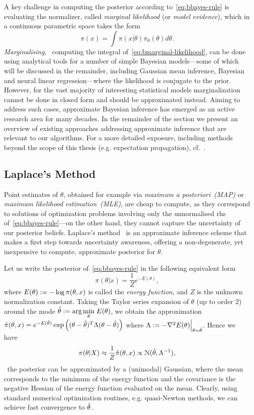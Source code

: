 A key challenge in computing the posterior according to~\cref{eq:bbayes-rule} is evaluating the normalizer, called \emph{marginal likelihood} (or \emph{model evidence}), which in a continuous parametric space takes the form
\[
\pi(x) = \int \pi(x|\theta) \pi_0(\theta) d\theta.
\label{eq:bmarginal-likelihood}
\]
\emph{Marginalising}, \ie~computing the integral of~\cref{eq:bmarginal-likelihood}, can be done using analytical tools for a number of simple Bayesian models---some of which will be discussed in the remainder, including Gaussian mean inference, Bayesian and neural linear regression---where the likelihood is conjugate to the prior. However, for the vast majority of interesting statistical models marginalization cannot be done in closed form and should be approximated instead. Aiming to address such cases, approximate Bayesian inference has emerged as an active research area for many decades. In the remainder of the section we present an overview of existing approaches addressing approximate inference that are relevant to our algorithms. For a more detailed exposure, including methods beyond the scope of this thesis (e.g. expectation propagation), cf.~\citep{bishop06,murphy12,angelino16}.

\subsection{Laplace's Method}
\label{subsec:b-laplace-method}

Point estimates of $\theta$, obtained for example via \emph{maximum a posteriori~(MAP)} or \emph{maximum likelihood estimation~(MLE)}, are cheap to compute, as they correspond to solutions of optimization problems involving only the unnormalised rhs of~\cref{eq:bbayes-rule}---on the other hand, they cannot capture the uncertainty of our posterior beliefs. Laplace's method~\citep{mackay03} is an approximate inference scheme that makes a first step towards uncertainty awareness, offering a non-degenerate, yet inexpensive to compute, approximate posterior for $\theta$.

Let us write the posterior of~\cref{eq:bbayes-rule} in the following equivalent form
\[
\pi(\theta|x) = \frac{1}{Z} e^{-E(\theta)},
\]
where $E(\theta) := - \log \pi(\theta, x)$ is called the \emph{energy function}, and $ Z $ is the unknown normalization constant. Taking the Taylor series expansion of $\theta$ (up to order 2) around the mode $ {\hat{\theta} := \arg \underset{\theta}{\min} \;E(\theta)}$, we obtain the approximation 
$ \hat{\pi}(\theta, x) = e^{-E(\hat{\theta})}\exp\left((\theta - \hat{\theta})^T\Lambda (\theta - \hat{\theta})\right)$ where  $ \Lambda := -\nabla^2 E(\theta)\Big|_{\theta = \hat{\theta}}$.
Hence we have
\[
\pi(\theta|X) \approx \frac{1}{Z}   \hat{\pi}(\theta, x)  \propto \mathcal{N}(\hat{\theta}, \Lambda^{-1}), 
\label{eq:blaplace-approx}
\]  
\ie~the posterior can be approximated by a (unimodal) Gaussian, where the mean corresponds to the minimum of the energy function and the covariance is the negative Hessian of the energy function evaluated on the mean. Clearly, using standard numerical optimization routines, e.g. quasi-Newton methods, we can achieve fast convergence to $\hat{\theta}$. 

